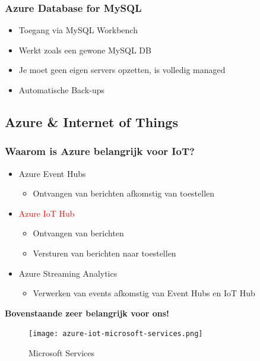 \documentclass{article}
\newcommand{\bold}[1]{\textbf{#1}}
\begin{document}
\subsubsection{Azure Database for MySQL}

\begin{itemize}
    \item Toegang via MySQL Workbench
    \item Werkt zoals een gewone MySQL DB
    \item Je moet geen eigen servers opzetten, is volledig managed
    \item Automatische Back-ups
\end{itemize}

\subsection{Azure \& Internet of Things}

\subsubsection{Waarom is Azure belangrijk voor IoT?}

\begin{itemize}
    \item Azure Event Hubs
    \begin{itemize}
        \item Ontvangen van berichten afkomstig van toestellen
    \end{itemize}
    \item \textcolor{red}{Azure IoT Hub}
    \begin{itemize}
        \item Ontvangen van berichten
        \item Versturen van berichten naar toestellen
    \end{itemize}
    \item Azure Streaming Analytics
    \begin{itemize}
        \item Verwerken van events afkomstig van Event Hubs en IoT Hub
    \end{itemize}
\end{itemize}

\bold{Bovenstaande zeer belangrijk voor ons!}

\begin{figure}[H]
    \centering
    \texttt{[image: azure-iot-microsoft-services.png]}
    \caption{Microsoft Services}
\end{figure}
\end{document}
